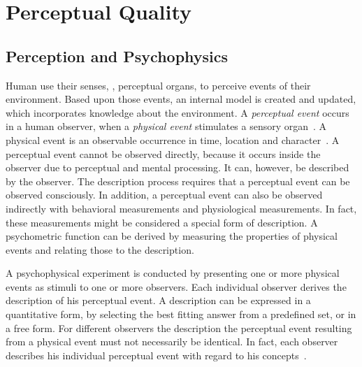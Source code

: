 \section{Perceptual Quality}
\subsection{Perception and Psychophysics}
Human use their senses, \ie, perceptual organs, to perceive events of their environment.
Based upon those events, an internal model is created and updated, which incorporates knowledge about the environment.
A \emph{perceptual event} occurs in a human observer, when a \emph{physical event} stimulates a sensory organ~\citep[p.~5]{blauert_spatial_1996}.
A physical event is an observable occurrence in time, location and character~\citep{callet_qualinet_2013}.
A perceptual event cannot be observed directly, because it occurs inside the observer due to perceptual and mental processing.
It can, however, be described by the observer.
The description process requires that a perceptual event can be observed consciously.
In addition, a perceptual event can also be observed indirectly with behavioral measurements and physiological measurements.
In fact, these measurements might be considered a special form of description.
A psychometric function can be derived by measuring the properties of physical events and relating those to the description.

A psychophysical experiment is conducted by presenting one or more physical events as stimuli to one or more observers.
Each individual observer derives the description of his perceptual event.
A description can be expressed in a quantitative form, by selecting the best fitting answer from a predefined set, or in a free form.
For different observers the description the perceptual event resulting from a physical event must not necessarily be identical.
In fact, each observer describes his individual perceptual event with regard to his concepts~\citep[p.~11]{blauert_spatial_1996}.

